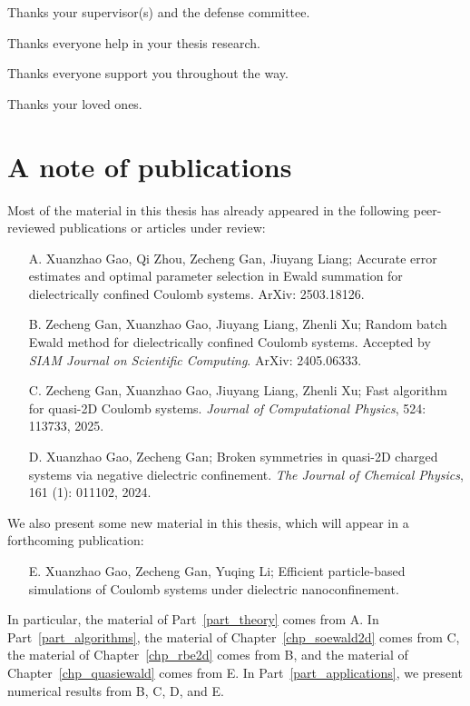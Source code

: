 Thanks your supervisor(s) and the defense committee. 

Thanks everyone help in your thesis research.

Thanks everyone support you throughout the way.

Thanks your loved ones.


\section*{A note of publications}

Most of the material in this thesis has already appeared in the following peer-reviewed publications or articles under review:
\begin{itemize}
    \item[A.] Xuanzhao Gao, Qi Zhou, Zecheng Gan, Jiuyang Liang; Accurate error estimates and optimal parameter selection in Ewald summation for dielectrically confined Coulomb systems. ArXiv: 2503.18126.
    \item[B.] Zecheng Gan, Xuanzhao Gao, Jiuyang Liang, Zhenli Xu; Random batch Ewald method for dielectrically confined Coulomb systems. Accepted by \emph{SIAM Journal on Scientific Computing}. ArXiv: 2405.06333.
    \item[C.] Zecheng Gan, Xuanzhao Gao, Jiuyang Liang, Zhenli Xu; Fast algorithm for quasi-2D Coulomb systems. \emph{Journal of Computational Physics}, 524: 113733, 2025.
    \item[D.] Xuanzhao Gao, Zecheng Gan; Broken symmetries in quasi-2D charged systems via negative dielectric confinement. \emph{The Journal of Chemical Physics}, 161 (1): 011102, 2024.
\end{itemize}
We also present some new material in this thesis, which will appear in a forthcoming publication:
\begin{itemize}
    \item[E.] Xuanzhao Gao, Zecheng Gan, Yuqing Li; Efficient particle-based simulations of Coulomb systems under dielectric nanoconfinement.
\end{itemize}
In particular, the material of Part~\ref{part_theory} comes from A.
In Part~\ref{part_algorithms}, the material of Chapter~\ref{chp_soewald2d} comes from C, the material of Chapter~\ref{chp_rbe2d} comes from B, and the material of Chapter~\ref{chp_quasiewald} comes from E.
In Part~\ref{part_applications}, we present numerical results from B, C, D, and E.